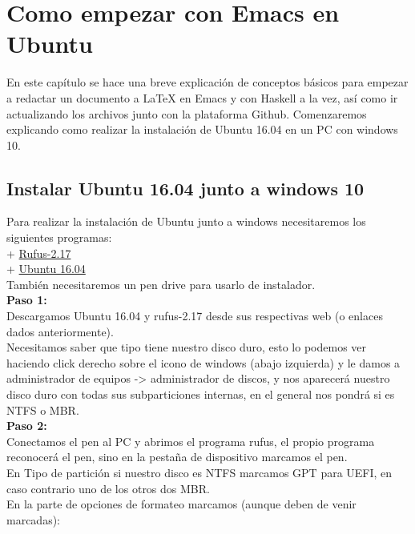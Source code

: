 \chapter{Como empezar con Emacs en Ubuntu}

En este capítulo se hace una breve explicación de conceptos básicos para empezar a redactar un documento a LaTeX en Emacs y con Haskell a la vez, así como ir actualizando los archivos junto con la plataforma Github. Comenzaremos explicando como realizar la instalación de Ubuntu 16.04 en un PC con windows 10.\\

\section{Instalar Ubuntu 16.04 junto a windows 10}

Para realizar la instalación de Ubuntu junto a windows necesitaremos los siguientes programas:\\

+ \href{https://rufus.akeo.ie/?locale=es_ES}{Rufus-2.17}\\

+ \href{https://www.ubuntu.com/download/desktop}{Ubuntu 16.04}\\

También necesitaremos un pen drive para usarlo de instalador.\\

\textbf{Paso 1:}\\
Descargamos Ubuntu 16.04 y rufus-2.17 desde sus respectivas web (o enlaces dados anteriormente).\\
Necesitamos saber que tipo tiene nuestro disco duro, esto lo podemos ver haciendo click derecho sobre el icono de windows (abajo izquierda) y le damos a administrador de equipos -> administrador de discos, y nos aparecerá nuestro disco duro con todas sus subparticiones internas, en el general nos pondrá si es NTFS o MBR.\\

\textbf{Paso 2:}\\
Conectamos el pen al PC y abrimos el programa rufus, el propio programa reconocerá el pen, sino en la pestaña de dispositivo marcamos el pen.\\

En Tipo de partición si nuestro disco es NTFS marcamos GPT para UEFI, en caso contrario uno de los otros dos MBR.\\

En la parte de opciones de formateo marcamos (aunque deben de venir marcadas):\\

